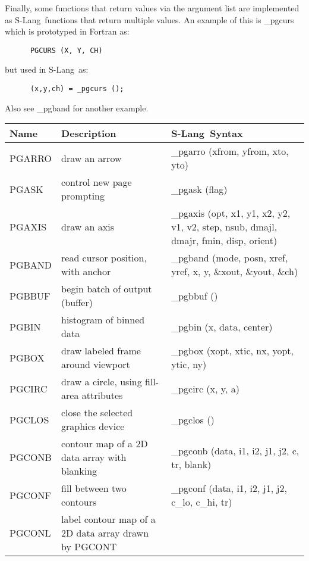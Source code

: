 \documentclass{book}
\newcommand{\slang}{{\sc S-Lang}}
\begin{document}
Finally, some functions that return values via the argument list are
implemented as \slang\  functions that return multiple values.  An example
of this is \_pgcurs which is prototyped in {\sc Fortran} as:
\begin{verbatim}
      PGCURS (X, Y, CH)
\end{verbatim}
but used in \slang\  as:
\begin{verbatim}
      (x,y,ch) = _pgcurs ();
\end{verbatim}
Also see \_pgband for another example.

\vfill
\newpage

\begin{center}
\begin{tabular}{|l|p{2.5in}|p{2.25in}|}
\hline
Name &  Description & \slang\ Syntax \\
\hline
\hline
PGARRO & draw an arrow                                                  &
\_pgarro (xfrom, yfrom, xto, yto) \\
PGASK & control new page prompting                                      &
\_pgask (flag) \\
PGAXIS & draw an axis                                                   &
\_pgaxis (opt, x1, y1, x2, y2, v1, v2, step, nsub, dmajl, dmajr, fmin, disp, orient) \\
PGBAND & read cursor position, with anchor                                 &
\_pgband (mode, posn, xref, yref, x, y, \&xout, \&yout, \&ch) \\
PGBBUF & begin batch of output (buffer)                                 &
\_pgbbuf () \\
PGBIN & histogram of binned data                                        &
\_pgbin (x, data, center) \\
PGBOX & draw labeled frame around viewport                              &
\_pgbox (xopt, xtic, nx, yopt, ytic, ny) \\
PGCIRC & draw a circle, using fill-area attributes                      &
\_pgcirc (x, y, a) \\
PGCLOS & close the selected graphics device                             &
\_pgclos () \\
PGCONB & contour map of a 2D data array with blanking      &
\_pgconb (data, i1, i2, j1, j2, c, tr, blank) \\
PGCONF & fill between two contours                                      &
\_pgconf (data, i1, i2, j1, j2, c\_lo, c\_hi, tr) \\
PGCONL & label contour map of a 2D data array drawn by PGCONT       &

\end{tabular}
\end{center}
\end{document}
